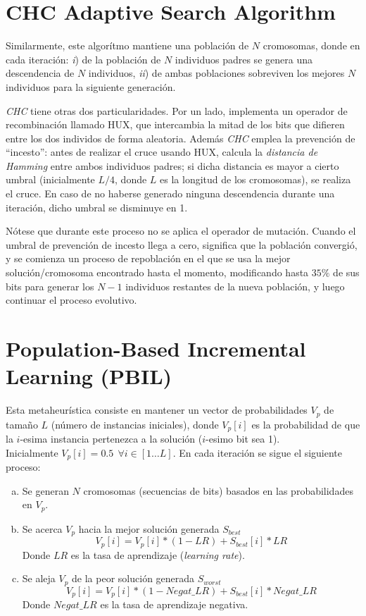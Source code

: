 \section{CHC Adaptive Search Algorithm}

Similarmente, este algorítmo mantiene una población de $N$ cromosomas, donde en cada iteración: \emph{i}) de la población de $N$ individuos padres se genera una descendencia de $N$ individuos, \emph{ii}) de ambas poblaciones sobreviven los mejores $N$ individuos para la siguiente generación.

\emph{CHC} tiene otras dos particularidades. Por un lado, implementa un operador de recombinación llamado HUX, que intercambia la mitad de los bits que difieren entre los dos individos de forma aleatoria. Además \emph{CHC} emplea la prevención de ``incesto'': antes de realizar el cruce usando HUX, calcula la \emph{distancia de Hamming} entre ambos individuos padres; si dicha distancia es mayor a cierto umbral (inicialmente $L/4$, donde $L$ es la longitud de los cromosomas), se realiza el cruce. En caso de no haberse generado ninguna descendencia durante una iteración, dicho umbral se disminuye en 1.

Nótese que durante este proceso no se aplica el operador de mutación. Cuando el umbral de prevención de incesto llega a cero, significa que la población convergió, y se comienza un proceso de repoblación en el que se usa la mejor solución/cromosoma encontrado hasta el momento, modificando hasta $35\%$ de sus bits para generar los $N-1$ individuos restantes de la nueva población, y luego continuar el proceso evolutivo.

\section{Population-Based Incremental Learning (PBIL)}

Esta metaheurística consiste en mantener un vector de probabilidades $V_p$ de tamaño $L$ (número de instancias iniciales), donde $V_p\left[i\right]$ es la probabilidad de que la $i$-esima instancia pertenezca a la solución ($i$-esimo bit sea 1).\\
Inicialmente $V_p\left[i\right] = 0.5\ \ \forall{i \in [1\dots L]}$. En cada iteración se sigue el siguiente proceso:

\begin{enumerate}[a)]
\item Se generan $N$ cromosomas (secuencias de bits) basados en las probabilidades en $V_p$.
\item Se acerca $V_p$ hacia la mejor solución generada $S_{best}$
$$V_p\left[i\right]=V_p\left[i\right]*(1-LR)+S_{best}\left[i\right]*LR$$
Donde $LR$ es la tasa de aprendizaje (\emph{learning rate}).
\item Se aleja $V_p$ de la peor solución generada $S_{worst}$\\
$$V_p\left[i\right]=V_p\left[i\right]*(1-Negat\_LR)+S_{best}\left[i\right]*Negat\_LR$$
Donde $Negat\_LR$ es la tasa de aprendizaje negativa.
\end{enumerate}

